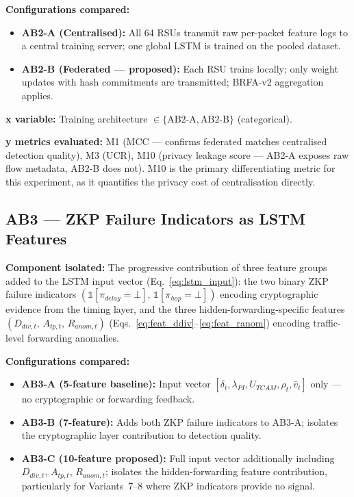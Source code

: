 \documentclass[12pt, a4paper]{report}
\begin{document}
{{\textbf{Configurations compared:}
\begin{itemize}
    \item \textbf{AB2-A (Centralised):} All 64 RSUs
    transmit raw per-packet feature logs to a central
    training server; one global \ac{LSTM} is trained
    on the pooled dataset.
    \item \textbf{AB2-B (Federated — proposed):}
    Each \ac{RSU} trains locally; only weight updates
    with hash commitments are transmitted; BRFA-v2
    aggregation applies.
\end{itemize}

\textbf{x variable:} Training architecture
$\in \{\text{AB2-A}, \text{AB2-B}\}$ (categorical).

\textbf{y metrics evaluated:} M1 (MCC — confirms federated
matches centralised detection quality), M3 (UCR), M10
(privacy leakage score — AB2-A exposes raw flow metadata,
AB2-B does not). M10 is the primary differentiating metric
for this experiment, as it quantifies the privacy cost of
centralisation directly.


\subsection{AB3 — ZKP Failure Indicators as LSTM Features}
\label{sec:ab3}

\textbf{Component isolated:}
The progressive contribution of three feature groups
added to the \ac{LSTM} input vector
(Eq.~\ref{eq:lstm_input}): the two binary \ac{ZKP}
failure indicators
$(\mathbb{1}[\pi_{delay}{=}\bot],\,
\mathbb{1}[\pi_{hop}{=}\bot])$ encoding cryptographic
evidence from the timing layer, and the three
hidden-forwarding-specific features
$(D_{div,t},\, A_{tp,t},\, R_{anom,t})$
(Eqs.~\ref{eq:feat_ddiv}--\ref{eq:feat_ranom})
encoding traffic-level forwarding anomalies.

\textbf{Configurations compared:}
\begin{itemize}
    \item \textbf{AB3-A (5-feature baseline):}
    Input vector $[\delta_t, \lambda_{PI},
    U_{TCAM}, \rho_t, \bar{v}_t]$ only ---
    no cryptographic or forwarding feedback.
    \item \textbf{AB3-B (7-feature):}
    Adds both \ac{ZKP} failure indicators to
    AB3-A; isolates the cryptographic layer
    contribution to detection quality.
    \item \textbf{AB3-C (10-feature proposed):}
    Full input vector additionally including
    $D_{div,t}$, $A_{tp,t}$, $R_{anom,t}$;
    isolates the hidden-forwarding feature
    contribution, particularly for Variants~7--8
    where \ac{ZKP} indicators provide no signal.
\end{itemize}

}}
\end{document}

